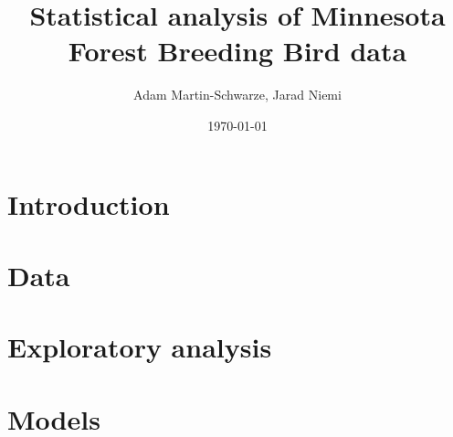 \documentclass{article}
\title{Statistical analysis of Minnesota Forest Breeding Bird data}
\author{Adam Martin-Schwarze, Jarad Niemi}
\date{\today}
\begin{document}
\maketitle
\tableofcontents
\newpage


\section{Introduction}



\section{Data} 



\section{Exploratory analysis}



\section{Models}


\end{document}

